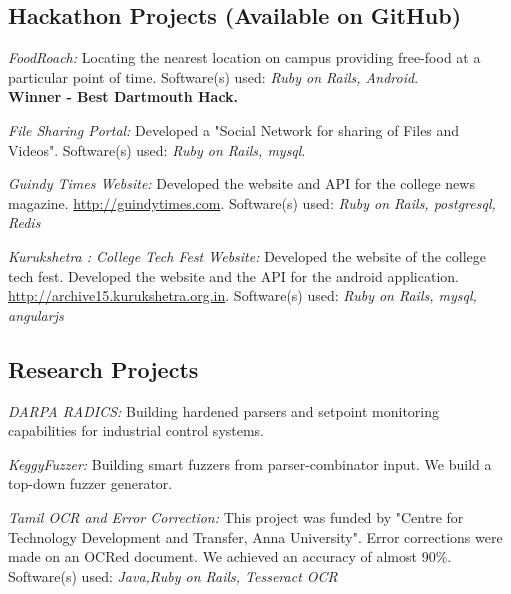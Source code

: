 \documentclass[letterpaper,10pt]{article}
\renewenvironment{itemize}{
	\begin{list}{}{
			\setlength{\leftmargin}{1.5em}
		}
	}{
	\end{list}
}
\begin{document}
\subsection*{Hackathon Projects (Available on GitHub)}
\begin{itemize}
	\setlength\itemsep{0ex}
	\item \textit{FoodRoach:} Locating the nearest location on campus providing free-food at a particular point of time. Software(s) used: \textsl{Ruby on Rails, Android}. \\ {\bf Winner - Best Dartmouth Hack.}
	\item \textit{File Sharing Portal:} Developed a "Social Network for sharing of Files and Videos". Software(s) used: \textsl{Ruby on Rails, mysql}.
	\item \textit{Guindy Times Website:} Developed the website and API for the college news magazine. \url{http://guindytimes.com}. Software(s) used: \textsl{Ruby on Rails, postgresql, Redis}
	\item \textit{Kurukshetra : College Tech Fest Website:} Developed the website of the college tech fest. Developed the website and the API for the android application. \url{http://archive15.kurukshetra.org.in}. Software(s) used: \textsl{Ruby on Rails, mysql, angularjs}
\end{itemize}


\subsection*{Research Projects}

\begin{itemize}
	\setlength\itemsep{0ex}

	\item \textit{DARPA RADICS:} Building hardened parsers and setpoint monitoring capabilities for industrial control systems.

	\item \textit{KeggyFuzzer:} Building smart fuzzers from parser-combinator input. We build a top-down fuzzer generator.

	\item \textit{Tamil OCR and Error Correction:} This project was funded by "Centre for Technology Development and Transfer, Anna University". Error corrections were made on an OCRed document. We achieved an accuracy of almost 90\%. Software(s) used: \textsl{Java,Ruby on Rails, Tesseract OCR}

\end{itemize}
\end{document}

